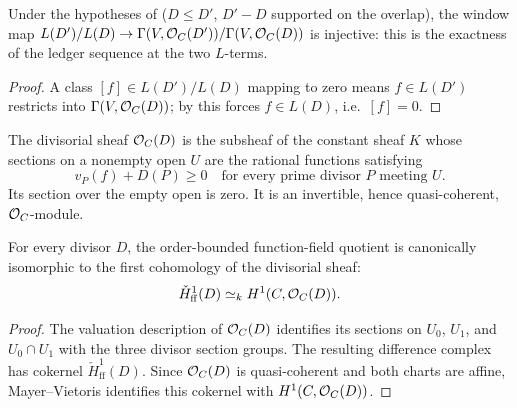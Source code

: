 \begin{theorem}
  \label{thm:adelic_windowMap_injective}
  \leanok
  Under the hypotheses of 
  (\(D \le D'\), \(D' - D\) supported on the overlap), the window map
  \(L(D')/L(D) \to \Gamma(V, \mathcal{O}_{C}(D'))/\Gamma(V, \mathcal{O}_{C}(D))\)
  is injective: this is the exactness of the ledger sequence at the two
  \(L\)-terms.
\end{theorem}
\begin{proof}
  \leanok
  A class \([f] \in L(D')/L(D)\) mapping to zero means \(f \in L(D')\)
  restricts into \(\Gamma(V, \mathcal{O}_{C}(D))\); by
   this forces \(f \in
  L(D)\), i.e.\ \([f] = 0\).
\end{proof}

\begin{definition}
  \label{def:adelic_divisorial_sheaf}
  The divisorial sheaf \(\mathcal{O}_{C}(D)\) is the subsheaf of the constant
  sheaf \(K\) whose sections on a nonempty open \(U\) are the rational
  functions satisfying
  \[
    v_P(f)+D(P)\geq 0
    \quad\text{for every prime divisor }P\text{ meeting }U.
  \]
  Its section over the empty open is zero.  It is an invertible, hence
  quasi-coherent, \(\mathcal{O}_{C}\)-module.
\end{definition}

\begin{proposition}
  \label{thm:adelic_function_field_H1_compare}
  For every divisor \(D\), the order-bounded function-field quotient is
  canonically isomorphic to the first cohomology of the divisorial sheaf:
  \[
    \check H^1_{\mathrm{ff}}(D)\simeq_k H^1(C,\mathcal{O}_{C}(D)).
  \]
\end{proposition}
\begin{proof}
  The valuation description of \(\mathcal{O}_{C}(D)\) identifies its sections on
  \(U_0\), \(U_1\), and \(U_0\cap U_1\) with the three divisor section
  groups.  The resulting difference complex has cokernel
  \(\check H^1_{\mathrm{ff}}(D)\).  Since \(\mathcal{O}_{C}(D)\) is
  quasi-coherent and both charts are affine, Mayer--Vietoris identifies
  this cokernel with \(H^1(C,\mathcal{O}_{C}(D))\).
\end{proof}


